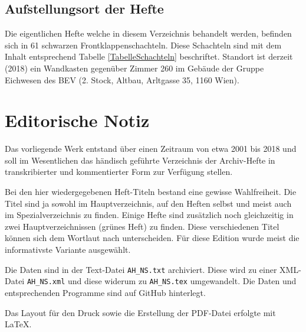 \documentclass[a4paper]{scrbook}
\begin{document}
\section{Aufstellungsort der Hefte}

Die eigentlichen Hefte welche in diesem Verzeichnis behandelt werden, befinden sich in 61 schwarzen Frontklappenschachteln. Diese Schachteln sind mit dem Inhalt entsprechend Tabelle \ref{TabelleSchachteln}{} beschriftet. Standort ist derzeit (2018) ein Wandkasten gegenüber Zimmer 260  im Gebäude der Gruppe Eichwesen des BEV (2. Stock, Altbau, Arltgasse 35, 1160 Wien).





\chapter{Editorische Notiz}
Das vorliegende Werk entstand über einen Zeitraum von etwa 2001 bis 2018 und soll im Wesentlichen das händisch geführte Verzeichnis der Archiv-Hefte in transkribierter und kommentierter Form zur Verfügung stellen.

Bei den hier wiedergegebenen Heft-Titeln bestand eine gewisse Wahlfreiheit. Die Titel sind ja sowohl im Hauptverzeichnis, auf den Heften selbst und meist auch im Spezialverzeichnis zu finden. Einige Hefte sind zusätzlich noch gleichzeitig in zwei Hauptverzeichnissen (\glqq{}grünes Heft\grqq{}) zu finden. Diese verschiedenen Titel können sich dem Wortlaut nach unterscheiden. Für diese Edition wurde meist die informativste Variante ausgewählt.

Die Daten sind in der Text-Datei \texttt{AH\_NS.txt} archiviert. Diese wird zu einer XML-Datei \texttt{AH\_NS.xml} und diese widerum zu \texttt{AH\_NS.tex} umgewandelt. Die Daten und entsprechenden Programme sind auf GitHub hinterlegt.

Das Layout für den Druck sowie die Erstellung der PDF-Datei erfolgte mit \LaTeX.
\end{document}
